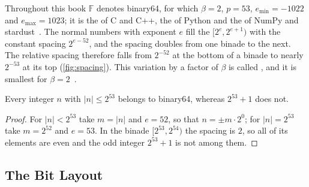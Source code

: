 Throughout this book $\mathbb F$ denotes binary64, for which $\beta=2$, $p=53$, $e_{\min}=-1022$ and $e_{\max}=1023$; it is the  of C and C++, the  of Python and the  of NumPy and stardust~\cite{ieee754-2019}. The normal numbers with exponent $e$ fill the  $[2^e,2^{e+1})$ with the constant spacing $2^{e-52}$, and the spacing doubles from one binade to the next. The relative spacing therefore falls from $2^{-52}$ at the bottom of a binade to nearly $2^{-53}$ at its top (\cref{fig:spacing}). This variation by a factor of $\beta$ is called , and it is smallest for $\beta=2$~\cite{goldberg1991}.

\begin{figure}
\end{figure}

\begin{proposition}
\label{prop:fp-integers}
Every integer $n$ with $|n|\le2^{53}$ belongs to binary64, whereas $2^{53}+1$ does not.
\end{proposition}

\begin{proof}
For $|n|<2^{53}$ take $m=|n|$ and $e=52$, so that $n=\pm m\cdot2^0$; for $|n|=2^{53}$ take $m=2^{52}$ and $e=53$. In the binade $[2^{53},2^{54})$ the spacing is $2$, so all of its elements are even and the odd integer $2^{53}+1$ is not among them.
\end{proof}

\subsection{The Bit Layout}

